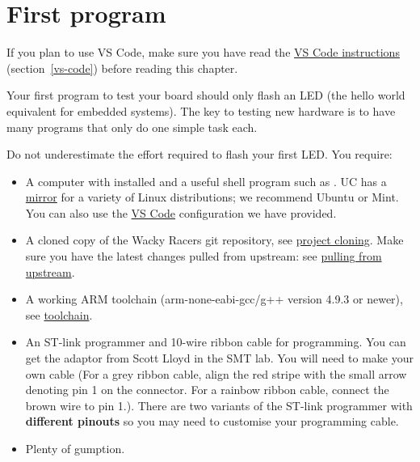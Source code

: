 \chapter{First program}
\label{first-program}

If you plan to use VS Code, make sure you have read the
\hyperref[vs-code]{VS Code instructions} (section~\ref{vs-code}) before
reading this chapter.

Your first program to test your board should only flash an LED (the
hello world equivalent for embedded systems). The key to testing new
hardware is to have many programs that only do one simple task each.

Do not underestimate the effort required to flash your first LED. You
require:
%
\begin{itemize}
\item
  A computer with  installed and a useful shell program
  such as . UC has a
  \href{http://ucmirror.canterbury.ac.nz/}{mirror} for a variety of
  Linux distributions; we recommend Ubuntu or Mint. You can also use
  the \hyperref[vs-code]{VS Code} configuration we have provided.

\item A cloned copy of the Wacky Racers git repository, see
  \hyperref[project-cloning]{project cloning}. Make sure you have the
  latest changes pulled from upstream: see
  \hyperref[git-pulling-from-upstream]{pulling from upstream}.

\item
  A working ARM toolchain (arm-none-eabi-gcc/g++ version 4.9.3 or
  newer), see \hyperref[toolchain]{toolchain}.

\item
  An ST-link programmer and 10-wire ribbon cable for programming. You
  can get the adaptor from Scott Lloyd in the SMT lab. You will need
  to make your own cable (For a grey ribbon cable, align the red
  stripe with the small arrow denoting pin 1 on the connector. For a
  rainbow ribbon cable, connect the brown wire to pin 1.). There are
  two variants of the ST-link programmer with \textbf{different
  pinouts} so you may need to customise your programming cable.
\item
  Plenty of gumption.
\end{itemize}


